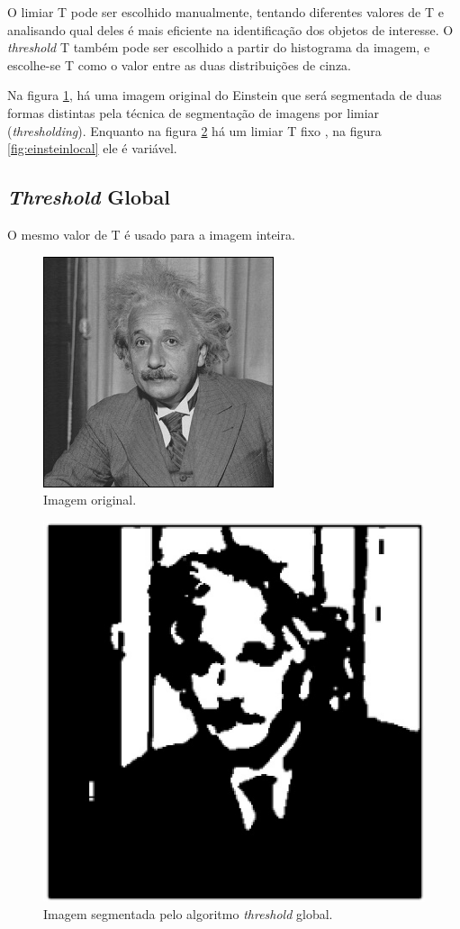 O limiar T pode ser escolhido manualmente, tentando diferentes valores de T e analisando qual deles é mais eficiente na identificação dos objetos de interesse.
O \textit{threshold} T também pode ser escolhido a partir do histograma da imagem, e escolhe-se T como o valor entre as duas distribuições de cinza.

Na figura \ref{fig:einstein}, há uma imagem original do Einstein que será segmentada de duas formas distintas pela técnica de segmentação de imagens por limiar (\textit{thresholding}). Enquanto na figura \ref{fig:einsteinglobal} há um limiar T fixo , na  figura \ref{fig:einsteinlocal} ele é variável.

\subsection{\textit{Threshold} Global}
O mesmo valor de T é usado para a imagem inteira.

  \begin{figure}[!htb]
       \begin{center}  
          \includegraphics[width=0.3\columnwidth]{img/einstein.jpg}
           \caption{\label{fig:einstein}Imagem original. \citep{stanford}}
       \end{center}
   \end{figure}

  \begin{figure}[!htb]
       \begin{center}  
          \includegraphics[width=0.3\columnwidth]{img/einstein-globalthresholding127.jpg}
           \caption{\label{fig:einsteinglobal}Imagem segmentada pelo algoritmo \textit{threshold} global.}
       \end{center}
   \end{figure}


